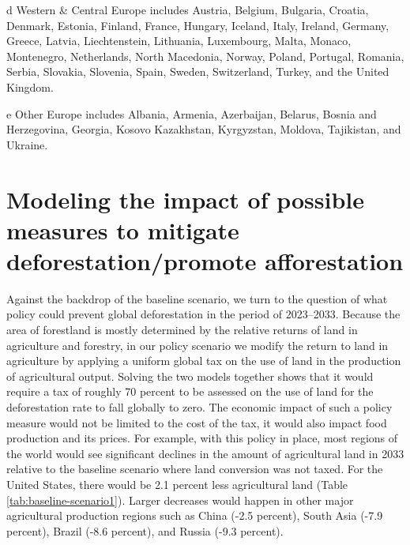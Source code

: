 \documentclass[
]{article}
\begin{document}
\begin{table}
\begin{threeparttable}
\begin{tablenotes}
\item [d] Western \& Central Europe includes  Austria, Belgium, Bulgaria, Croatia, Denmark, Estonia, Finland, France, Hungary, Iceland, Italy, Ireland, Germany, Greece, Latvia, Liechtenstein, Lithuania, Luxembourg, Malta, Monaco, Montenegro, Netherlands, North Macedonia, Norway, Poland, Portugal, Romania, Serbia, Slovakia, Slovenia, Spain, Sweden, Switzerland, Turkey, and the United Kingdom.
\item [e] Other Europe includes Albania, Armenia, Azerbaijan, Belarus, Bosnia and Herzegovina, Georgia,  Kosovo Kazakhstan, Kyrgyzstan, Moldova, Tajikistan, and Ukraine.
\end{tablenotes}
\end{threeparttable}
\end{table}

\hypertarget{modeling-the-impact-of-possible-measures-to-mitigate-deforestationpromote-afforestation}{%
\section{Modeling the impact of possible measures to mitigate deforestation/promote afforestation}\label{modeling-the-impact-of-possible-measures-to-mitigate-deforestationpromote-afforestation}}

Against the backdrop of the baseline scenario, we turn to the question of what policy could prevent global deforestation in the period of 2023--2033. Because the area of forestland is mostly determined by the relative returns of land in agriculture and forestry, in our policy scenario we modify the return to land in agriculture by applying a uniform global tax on the use of land in the production of agricultural output. Solving the two models together shows that it would require a tax of roughly 70 percent to be assessed on the use of land for the deforestation rate to fall globally to zero. The economic impact of such a policy measure would not be limited to the cost of the tax, it would also impact food production and its prices. For example, with this policy in place, most regions of the world would see significant declines in the amount of agricultural land in 2033 relative to the baseline scenario where land conversion was not taxed. For the United States, there would be 2.1 percent less agricultural land (Table \ref{tab:baseline-scenario1}). Larger decreases would happen in other major agricultural production regions such as China (-2.5 percent), South Asia (-7.9 percent), Brazil (-8.6 percent), and Russia (-9.3 percent).
\end{document}
